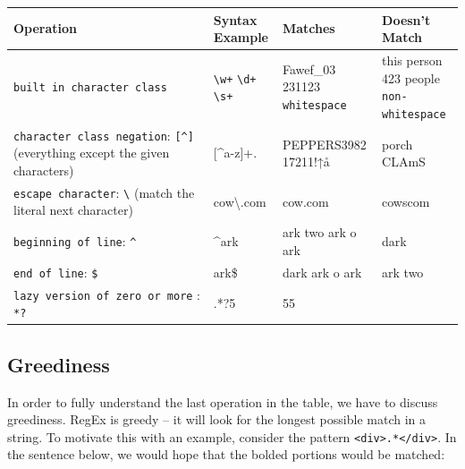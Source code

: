 \documentclass[
  letterpaper,
  DIV=11,
  numbers=noendperiod]{scrreprt}
\begin{document}
\begin{longtable}[]{@{}
  >{\raggedright\arraybackslash}p{}
  >{\raggedright\arraybackslash}p{}
  >{\raggedright\arraybackslash}p{}
  >{\raggedright\arraybackslash}p{}@{}}
\toprule\noalign{}
\begin{minipage}[b]{\linewidth}\raggedright
Operation
\end{minipage} & \begin{minipage}[b]{\linewidth}\raggedright
Syntax Example
\end{minipage} & \begin{minipage}[b]{\linewidth}\raggedright
Matches
\end{minipage} & \begin{minipage}[b]{\linewidth}\raggedright
Doesn't Match
\end{minipage} \\
\midrule\noalign{}
\endhead
\bottomrule\noalign{}
\endlastfoot
\texttt{built\ in\ character\ class} & \texttt{\textbackslash{}w+}
\texttt{\textbackslash{}d+} \texttt{\textbackslash{}s+} & Fawef\_03
231123 \texttt{whitespace} & this person 423 people
\texttt{non-whitespace} \\
\texttt{character\ class\ negation}: \texttt{{[}\^{}{]}} (everything
except the given characters) & {[}\^{}a-z{]}+. & PEPPERS3982 17211!↑å &
porch CLAmS \\
\texttt{escape\ character}: \texttt{\textbackslash{}} (match the literal
next character) & cow\textbackslash.com & cow.com & cowscom \\
\texttt{beginning\ of\ line}: \texttt{\^{}} & \^{}ark & ark two ark o
ark & dark \\
\texttt{end\ of\ line}: \texttt{\$} & ark\$ & dark ark o ark & ark
two \\
\texttt{lazy\ version\ of\ zero\ or\ more} : \texttt{*?} & 5.*?5 & 5005
55 & 5005005 \\
\end{longtable}

\subsection{Greediness}\label{greediness}

In order to fully understand the last operation in the table, we have to
discuss greediness. RegEx is greedy -- it will look for the longest
possible match in a string. To motivate this with an example, consider
the pattern
\texttt{\textless{}div\textgreater{}.*\textless{}/div\textgreater{}}. In
the sentence below, we would hope that the bolded portions would be
matched:
\end{document}
